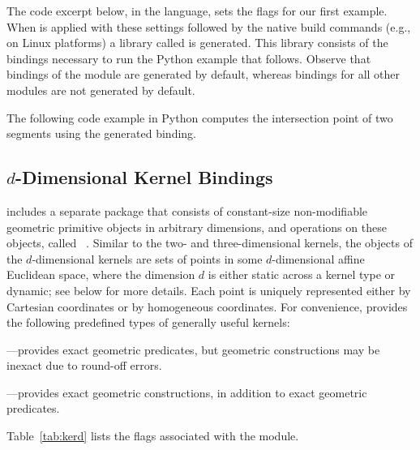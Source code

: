 The code excerpt below, in the \cmake{} language, sets the \cmake{}
flags for our first example. When  is applied with
these settings followed by the native build commands (e.g.,
 on Linux platforms) a library called
 is generated. This library consists of the
bindings necessary to run the Python example that follows. Observe
that bindings of the \iiDandiiiDGeometryKernelPackage{} module are
generated by default, whereas bindings for all other modules are
not generated by default.

The following code example in Python computes the intersection point
of two segments using the generated binding.

\subsection{$d$-Dimensional Kernel Bindings}
\label{ssec:modules:kerneld}
\cgal{} includes a separate package that consists of constant-size
non-modifiable geometric primitive objects in arbitrary dimensions,
and operations on these objects, called
\dDGeometryKernelPackage{}~\cite{cgal:s-gkd-21a}. Similar to the two-
and three-dimensional kernels, the objects of the $d$-dimensional
kernels are sets of points in some $d$-dimensional affine Euclidean
space, where the dimension $d$ is either static across a kernel type
or dynamic; see below for more details. Each point is uniquely
represented either by Cartesian coordinates or by homogeneous
coordinates. For convenience, \cgal{} provides the following predefined
types of generally useful kernels:
\begin{compactenum}
\item {}---provides exact geometric
  predicates, but geometric constructions may be inexact due to
  round-off errors.
\item {}---provides exact geometric
  constructions, in addition to exact geometric predicates.
\end{compactenum}
Table~\ref{tab:kerd} lists the \cmake{} flags associated with the
\dDGeometryKernelPackage{} module.

